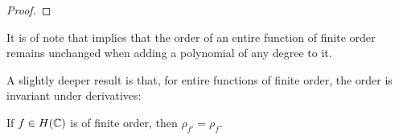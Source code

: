 \begin{proof}
\end{proof}

It is of note that  implies that the order of an entire function of finite order remains unchanged when adding a polynomial of any degree to it.

A slightly deeper result is that, for entire functions of finite order, the order is invariant under derivatives:

\begin{proposition} \label{prop:order-derivative}
    If $f \in H(\mathbb{C})$ is of finite order, then $\rho_{f'} = \rho_f$.
\end{proposition}

